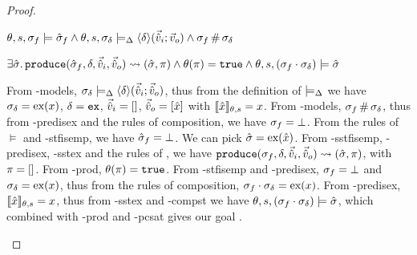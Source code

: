 \begin{proof}
\pfassume \begin{hypvlist}
 $\theta, s, \sigma_f \models \hat{\sigma}_f \land \theta, s, \sigma_\delta \models_{\Delta} \left<\delta\right>\!(\vec{\hat{v}}_i;\vec{v}_o) \land \sigma_f\operatorname{\#}\sigma_\delta$
\end{hypvlist}
\pfprove \begin{goalvlist}
 $\exists \hat{\sigma}\ldotp \texttt{produce}(\hat{\sigma}_f,\delta,\vec{\hat{v}}_i,\vec{\hat{v}}_o)\rightsquigarrow (\hat{\sigma},\pi) \land \theta(\pi)=\texttt{true} \land \theta,s,(\sigma_f\cdot\sigma_\delta) \models \hat{\sigma}$
\end{goalvlist}
\begin{hypvlist}
 From \hyp{models}, $\sigma_\delta\models_{\Delta} \left<\delta\right>\!(\vec{\hat{v}}_i;\vec{\hat{v}}_o)$, thus from the definition of $\models_{\Delta}$ we have $\sigma_\delta=\text{ex}(x)$, $\delta=\texttt{ex}$, $\vec{\hat{v}}_i=[]$, $\vec{\hat{v}}_o=[\hat{x}]$ with $\llbracket\hat{x}\rrbracket_{\theta,s}=x$.
 From \hyp{models}, $\sigma_f\operatorname{\#}\sigma_\delta$, thus from \hyp{predisex} and the rules of composition, we have $\sigma_f=\bot$.
 From the rules of $\models$ and \hyp{stfisemp}, we have $\hat{\sigma}_f=\bot$.
 We can pick $\hat{\sigma}=\text{ex}(\hat{x})$.
 From \hyp{sstfisemp}, \hyp{predisex}, \hyp{sstex} and the rules of \produce, we have ${\texttt{produce}(\sigma_f,\delta,\vec{\hat{v}}_i,\vec{\hat{v}}_o)\rightsquigarrow (\hat{\sigma},\pi)}$, with $\pi=[]$.
 From \hyp{prod}, $\theta(\pi)=\texttt{true}$.
 From \hyp{stfisemp} and \hyp{predisex}, $\sigma_f=\bot$ and $\sigma_\delta=\text{ex}(x)$, thus from the rules of composition, $\sigma_f\cdot\sigma_\delta=\text{ex}(x)$. 
 From \hyp{predisex}, $\llbracket\hat{x}\rrbracket_{\theta,s}=x$, thus from \hyp{sstex} and \hyp{compst} we have $\theta,s,(\sigma_f\cdot\sigma_\delta)\models\hat{\sigma}$, which combined with \hyp{prod} and \hyp{pcsat} gives our goal .
\end{hypvlist}

\end{proof}